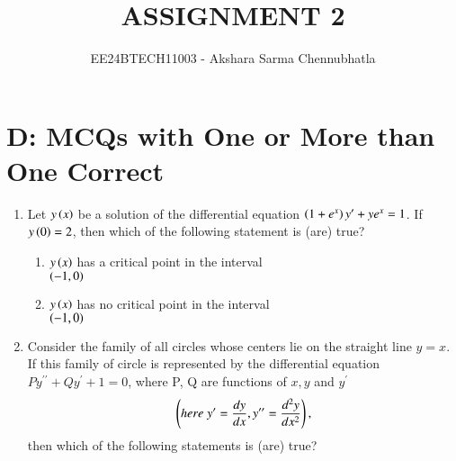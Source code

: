 \documentclass[journal,12pt,onecolumn,article]{IEEEtran}
\theoremstyle{remark}
\begin{document}

\vspace{3cm}
\title{ASSIGNMENT 2}
\author{EE24BTECH11003 - Akshara Sarma Chennubhatla}
\maketitle
\section{D: MCQs with One or More than One Correct}
\begin{enumerate}[start = 6]
\item Let $y\left(x\right)$ be a solution of the differential equation $\left(1+e^x\right)y^\prime + ye^x = 1$. If $y\left(0\right) = 2$, then which of the following statement is (are) true?
\hfill{}
\begin{enumerate}
\item $y\left(x\right)$ has a critical point in the interval \\ $\left(-1,0\right)$
\item $y\left(x\right)$ has no critical point in the interval \\ $\left(-1,0\right)$
\end{enumerate}
\item Consider the family of all circles whose centers lie on the straight line $y = x$. If this family of circle is represented by the differential equation $Py^{\prime\prime} + Qy^\prime + 1 = 0$, where P, Q are functions of $x,y$ and $y^\prime$
\begin{align}
\left(here\;y^\prime = \frac{dy}{dx}, y^{\prime\prime} = \frac{d^2y}{dx^2}\right),
\end{align} then which of the following statements is (are) true?
\hfill{}
\begin{enumerate}
\end{enumerate}
\end{enumerate}
\end{document}
